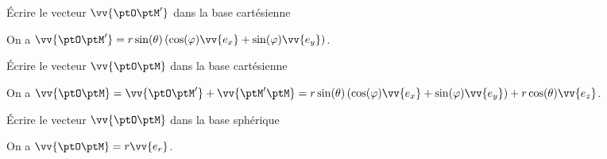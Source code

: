 

\begin{enonce}
	Écrire le vecteur $\vv{\ptO \ptM'}$ dans la base cartésienne
\end{enonce}


\begin{corrige}
	On a $\vv{\ptO \ptM'}=r\sin(\theta)  \left(\cos(\varphi) \vv{e_x}+\sin(\varphi) \vv{e_y}\right)$.
\end{corrige}




\begin{enonce}
	Écrire le vecteur $\vv{\ptO \ptM}$ dans la base cartésienne
	\end{enonce}
	
	
	\begin{corrige}
		On a $\vv{\ptO \ptM}=\vv{\ptO \ptM'}+\vv{\ptM' \ptM}=r\sin(\theta)  \left(\cos(\varphi) \vv{e_x}+\sin(\varphi) \vv{e_y}\right)+r\cos(\theta)\vv{e_z}$.
	\end{corrige}
	
	
	
	
	\begin{enonce}
		Écrire le vecteur $\vv{\ptO \ptM}$ dans la base sphérique
	\end{enonce}
	
	
	\begin{corrige}
		On a $\vv{\ptO \ptM}=r \vv{e_r}$.
	\end{corrige}
	
	
	
	
